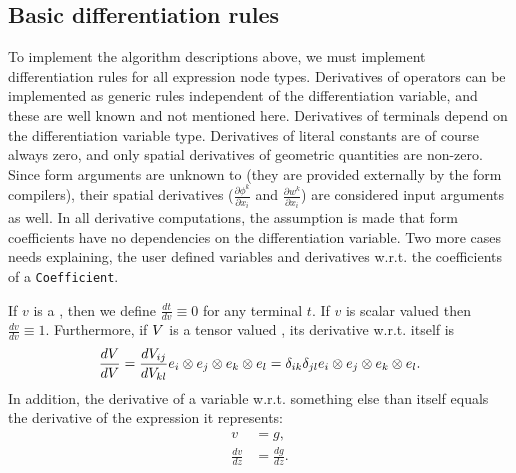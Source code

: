 \subsection{Basic differentiation rules}

To implement the algorithm descriptions above, we must implement
differentiation rules for all expression node types. Derivatives
of operators can be implemented as generic rules independent of the
differentiation variable, and these are well known and not mentioned
here. Derivatives of terminals depend on the differentiation variable
type.  Derivatives of literal constants are of course always zero,
and only spatial derivatives of geometric quantities are non-zero.
Since form arguments are unknown to \ufl{} (they are provided externally
by the form compilers), their spatial derivatives ($\frac{\partial
  \phi^k}{\partial x_i}$ and $\frac{\partial w^k}{\partial x_i}$) are
considered input arguments as well.  In all derivative computations,
the assumption is made that form coefficients have no dependencies
on the differentiation variable.  Two more cases needs explaining,
the user defined variables and derivatives w.r.t. the coefficients of
a \texttt{Coefficient}.

If $v$ is a , then we define $\frac{d t}{d v} \equiv 0$
for any terminal $t$. If $v$ is scalar valued then $\frac{d v}{d v}
\equiv 1$. Furthermore, if ${V}$ is a tensor valued ,
its derivative w.r.t. itself is
\begin{align}
\frac{d {V}}{d {V}}
    =
    \frac{d V_{ij}}{d V_{kl}}
    {e}_i\otimes{e}_j\otimes{e}_k\otimes{e}_l
    =
    \delta_{ik}\delta_{jl}
    {e}_i\otimes{e}_j\otimes{e}_k\otimes{e}_l .
\end{align}
In addition, the derivative of a variable w.r.t. something else than
itself equals the derivative of the expression it represents:
\begin{align}
v &= g, \\
\frac{d v}{d z} &= \frac{d g}{d z}.
\end{align}

